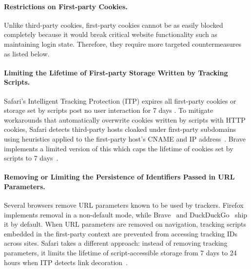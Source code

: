 \paragraph{Restrictions on First-party Cookies.}
Unlike third-party cookies, first-party cookies cannot be as easily blocked completely because it would break critical website functionality such as maintaining login state. 
%
Therefore, they require more targeted countermeasures as listed below. 




\paragraph{Limiting the Lifetime of First-party Storage Written by Tracking Scripts.}
%
Safari’s Intelligent Tracking Protection (ITP) expires all first-party cookies or storage set by scripts post no user interaction for 7 days \cite{TrackingPreventionWebKit2020}. 
%
To mitigate workarounds that automatically overwrite cookies written by scripts with HTTP cookies, Safari detects third-party hosts cloaked under first-party subdomains using heuristics applied to the first-party host’s CNAME and IP address~\cite{TrackingPreventionWebKit2020}. 
%
Brave implements a limited version of this which caps the lifetime of cookies set by scripts to 7 days~\cite{bravePrivacyProtectionSecurity}. \\




\paragraph{Removing or Limiting the Persistence of Identifiers Passed in URL Parameters.}
%
Several browsers remove URL parameters known to be used by trackers. 
%
Firefox~\cite{mozillaQueryParameterStripping} implements removal in a non-default mode, while Brave~\cite{braveprivacyteamGrabBagQuery2020} and DuckDuckGo~\cite{duckduckgoDuckDuckGoWebTracking} ship it by default. 
%
When URL parameters are removed on navigation, tracking scripts embedded in the first-party context are prevented from accessing tracking IDs across sites. 
%
Safari takes a different approach: instead of removing tracking parameters, it limits the lifetime of script-accessible storage from 7 days to 24 hours when ITP detects link decoration~\cite{TrackingPreventionWebKit2020}.



